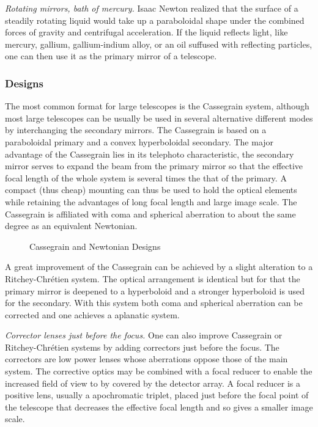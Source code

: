 \documentclass{article}
\begin{document}
\noindent
{\it Rotating mirrors, bath of mercury.} Isaac Newton realized that the surface of a steadily rotating liquid would take up a paraboloidal shape under the combined forces of gravity and
centrifugal acceleration. If the liquid reflects light, like mercury, gallium, gallium-indium alloy, or an oil suffused with reflecting particles, one can then use it as the primary mirror of a telescope. 

\subsubsection{Designs}

The most common format for large telescopes is the Cassegrain system, although
most large telescopes can be usually be used in several alternative 
different modes by interchanging the secondary mirrors. The Cassegrain is
based on a paraboloidal primary and a convex hyperboloidal secondary. The 
major advantage of the Cassegrain lies in its telephoto characteristic, 
the secondary mirror serves to expand the beam from the primary mirror so 
that the effective focal length of the whole system is several times the
that of the primary. A compact (thus cheap) mounting can thus be used to 
hold the optical elements while retaining the advantages of long focal length
and large image scale. The Cassegrain is affiliated with coma and spherical
aberration to about the same degree as an equivalent Newtonian.

\begin{figure}[th!]
\hfil{
\hfil
{}
}\hfil
  \caption{Cassegrain and Newtonian Designs}
  \label{fig:catatropic}
\end{figure}

A great improvement of the Cassegrain can be achieved by a slight alteration
to a Ritchey-Chr{\'e}tien system. The optical arrangement is identical but for
that the primary mirror is deepened to a hyperboloid and a stronger 
hyperboloid is used for the secondary. With this system both coma and 
spherical aberration can be corrected and one achieves a aplanatic system. 

\noindent
{\it Corrector lenses just before the focus.} One can also improve Cassegrain
or Ritchey-Chr\'etien systems by adding correctors just before the focus. 
The correctors are low power lenses whose aberrations oppose those of the main
system. The corrective optics may be combined with a focal reducer to enable 
the increased field of view to by covered by the detector array. A focal reducer
is a positive lens, usually a apochromatic triplet, placed just before the focal 
point of the telescope that decreases the effective focal length and so gives 
a smaller image scale.
\end{document}
